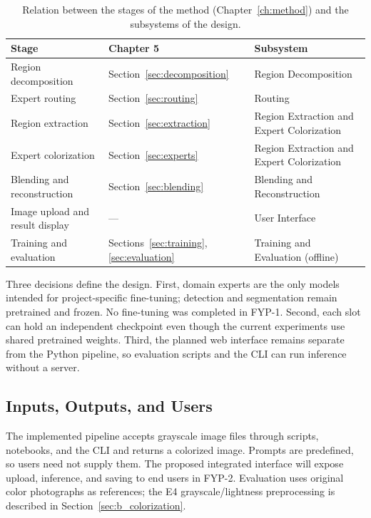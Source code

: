 \documentclass{FastFyp}
\begin{document}
\begin{table}[htbp]
    \centering
    \caption{Relation between the stages of the method (Chapter~\ref{ch:method}) and the subsystems of the design.}
    \label{tab:stagemap}
    \begin{tabular}{p{4.6cm}p{3.4cm}p{5cm}}
        \hline
        \textbf{Stage} & \textbf{Chapter 5} & \textbf{Subsystem} \\
        \hline
        Region decomposition & Section~\ref{sec:decomposition} & Region Decomposition \\
        Expert routing & Section~\ref{sec:routing} & Routing \\
        Region extraction & Section~\ref{sec:extraction} & Region Extraction and Expert Colorization \\
        Expert colorization & Section~\ref{sec:experts} & Region Extraction and Expert Colorization \\
        Blending and reconstruction & Section~\ref{sec:blending} & Blending and Reconstruction \\
        Image upload and result display & --- & User Interface \\
        Training and evaluation & Sections~\ref{sec:training}, \ref{sec:evaluation} & Training and Evaluation (offline) \\
        \hline
    \end{tabular}
\end{table}

Three decisions define the design. First, domain experts are the only models intended for project-specific fine-tuning; detection and segmentation remain pretrained and frozen. No fine-tuning was completed in FYP-1. Second, each slot can hold an independent checkpoint even though the current experiments use shared pretrained weights. Third, the planned web interface remains separate from the Python pipeline, so evaluation scripts and the CLI can run inference without a server.

\subsection{Inputs, Outputs, and Users}

The implemented pipeline accepts grayscale image files through scripts, notebooks, and the CLI and returns a colorized image. Prompts are predefined, so users need not supply them. The proposed integrated interface will expose upload, inference, and saving to end users in FYP-2. Evaluation uses original color photographs as references; the E4 grayscale/lightness preprocessing is described in Section~\ref{sec:b_colorization}.
\end{document}
